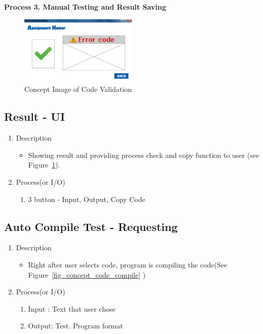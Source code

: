 \documentclass[conference]{IEEEtran}
\begin{document}
\textbf{Process 3. Manual Testing and Result Saving}


\textit{}
\begin{figure}[ht]
\centering
\includegraphics[width=0.5\textwidth]{./figures/UI_code_validation_fail.jpg}  
\caption{Concept Image of Code Validation}
\label{fig_concept_validation_manual}
\end{figure}


\subsection{Result - UI}
\begin{enumerate}
  \item Description
  \begin{itemize}
    \item Showing result and providing process check and copy function to user (see Figure~\ref{fig_concept_validation_manual}).
  \end{itemize}
  \item Process(or I/O)
  \begin{enumerate}
    \item 3 button - Input, Output, Copy Code
  \end{enumerate}
\end{enumerate}
\textit{}

\subsection{Auto Compile Test - Requesting}

\begin{enumerate}
  \item Description
  \begin{itemize}
    \item Right after user selects code, program is compiling the code(See Figure~\ref{fig_concept_code_compile} )
  \end{itemize}
  \item Process(or I/O)
  \begin{enumerate}
    \item Input : Text that user chose
    \item Output: Test. Program format
  \end{enumerate}
\end{enumerate}
\end{document}
